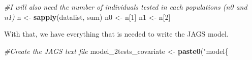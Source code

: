 \documentclass[
]{book}
\newenvironment{Shaded}{\begin{snugshade}}{\end{snugshade}}
\newcommand{\CommentTok}[1]{\textcolor[rgb]{0.56,0.35,0.01}{\textit{#1}}}
\newcommand{\DecValTok}[1]{\textcolor[rgb]{0.00,0.00,0.81}{#1}}
\newcommand{\FunctionTok}[1]{\textcolor[rgb]{0.13,0.29,0.53}{\textbf{#1}}}
\newcommand{\NormalTok}[1]{#1}
\newcommand{\OtherTok}[1]{\textcolor[rgb]{0.56,0.35,0.01}{#1}}
\newcommand{\StringTok}[1]{\textcolor[rgb]{0.31,0.60,0.02}{#1}}
\begin{document}
\begin{Shaded}
\begin{Highlighting}[]
\CommentTok{\#I will also need the number of individuals tested in each populations (n0 and n1)}
\NormalTok{n }\OtherTok{\textless{}{-}} \FunctionTok{sapply}\NormalTok{(datalist, sum)}
\NormalTok{n0 }\OtherTok{\textless{}{-}}\NormalTok{ n[}\DecValTok{1}\NormalTok{]}
\NormalTok{n1 }\OtherTok{\textless{}{-}}\NormalTok{ n[}\DecValTok{2}\NormalTok{]}
\end{Highlighting}
\end{Shaded}

With that, we have everything that is needed to write the JAGS model.

\begin{Shaded}
\begin{Highlighting}[]
\CommentTok{\#Create the JAGS text file}
\NormalTok{model\_2tests\_covariate }\OtherTok{\textless{}{-}} \FunctionTok{paste0}\NormalTok{(}\StringTok{"model\{}


\end{Highlighting}
\end{Shaded}
\end{document}
